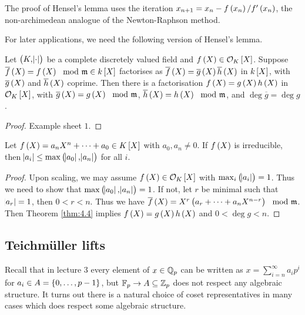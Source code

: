 \begin{remark*}
The proof of Hensel's lemma uses the iteration $ x_{n + 1} = x_n - f\br{x_n} / f'\br{x_n} $, the non-archimedean analogue of the Newton-Raphson method.
\end{remark*}

For later applications, we need the following version of Hensel's lemma.

\begin{theorem}
\label{thm:4.4}
Let $ \br{K, \abs{\cdot}} $ be a complete discretely valued field and $ f\br{X} \in \OOO_K\sbr{X} $. Suppose $ \overline{f}\br{X} = f\br{X} \mod \mmm \in k\sbr{X} $ factorises as $ \overline{f}\br{X} = \overline{g}\br{X}\overline{h}\br{X} $ in $ k\sbr{X} $, with $ \overline{g}\br{X} $ and $ \overline{h}\br{X} $ coprime. Then there is a factorisation $ f\br{X} = g\br{X}h\br{X} $ in $ \OOO_K\sbr{X} $, with $ \overline{g}\br{X} = g\br{X} \mod \mmm $, $ \overline{h}\br{X} = h\br{X} \mod \mmm $, and $ \deg \overline{g} = \deg g $.
\end{theorem}

\begin{proof}
Example sheet $ 1 $.
\end{proof}

\begin{corollary}
\label{cor:4.5}
Let $ f\br{X} = a_nX^n + \dots + a_0 \in K\sbr{X} $ with $ a_0, a_n \ne 0 $. If $ f\br{X} $ is irreducible, then $ \abs{a_i} \le \max\br{\abs{a_0}, \abs{a_n}} $ for all $ i $.
\end{corollary}

\begin{proof}
Upon scaling, we may assume $ f\br{X} \in \OOO_K\sbr{X} $ with $ \max_i\br{\abs{a_i}} = 1 $. Thus we need to show that $ \max\br{\abs{a_0}, \abs{a_n}} = 1 $. If not, let $ r $ be minimal such that $ \abs{a_r} = 1 $, then $ 0 < r < n $. Thus we have $ \overline{f}\br{X} = X^r\br{a_r + \dots + a_nX^{n - r}} \mod \mmm $. Then Theorem \ref{thm:4.4} implies $ f\br{X} = g\br{X}h\br{X} $ and $ 0 < \deg g < n $.
\end{proof}

\subsection{Teichm\"uller lifts}


Recall that in lecture $ 3 $ every element of $ x \in \mathbb{Q}_p $ can be written as $ x = \sum_{i = n}^\infty a_ip^i $ for $ a_i \in A = \cbr{0, \dots, p - 1} $, but $ \mathbb{F}_p \to A \subseteq \mathbb{Z}_p $ does not respect any algebraic structure. It turns out there is a natural choice of coset representatives in many cases which does respect some algebraic structure.

